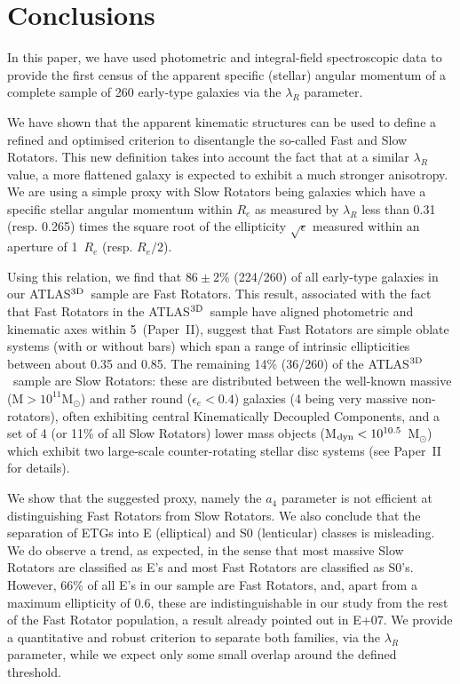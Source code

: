 \documentclass[useAMS,usenatbib,usegraphicx]{mn2e}
\newcommand{\atlas}{{ATLAS$^{\rm 3D}$}}
\begin{document}
\section{Conclusions}
\label{sec:conclusions}

In this paper, we have used photometric and integral-field spectroscopic data
to provide the first census of the apparent specific (stellar) angular momentum of
a complete sample of 260 early-type galaxies via the $\lambda_R$ parameter. 

We have shown that the apparent
kinematic structures can be used to define a refined and optimised criterion to disentangle
the so-called Fast and Slow Rotators. This new definition takes into account the
fact that at a similar $\lambda_R$ value, a more flattened galaxy is expected to exhibit
a much stronger anisotropy. We are using a simple proxy 
with Slow Rotators being galaxies which have a specific stellar angular momentum within $R_e$
as measured by ${\lambda_R}$ less than 0.31 (resp. 0.265) times the square root
of the ellipticity $\sqrt{\epsilon}$ measured within an aperture of 1~$R_e$ (resp. $R_e/2$).

Using this relation, we find that $86 \pm 2 $\% (224/260) of all early-type galaxies in
our \atlas\ sample are Fast Rotators. 
This result, associated with the fact that Fast Rotators
in the \atlas\ sample have aligned photometric and kinematic axes within 5\degr\
(Paper~II), suggest that Fast Rotators are simple
oblate systems (with or without bars) which span a range of intrinsic ellipticities 
between about 0.35 and 0.85. The remaining 14\% (36/260) of the \atlas\ sample
are Slow Rotators: these are distributed between the well-known massive (M$>10^{11}$M$_{\odot}$)
and rather round ($\epsilon_e < 0.4$) galaxies (4 being very massive
non-rotators), often exhibiting central Kinematically
Decoupled Components, and a set of 4 (or 11\% of all Slow Rotators) lower mass objects 
(M$_{\rm dyn} < 10^{10.5}$~M$_{\odot}$) which exhibit two large-scale 
counter-rotating stellar disc systems (see Paper~II for details).

We show that the suggested proxy, namely the $a_4$ parameter
is not efficient at distinguishing Fast Rotators from Slow Rotators. 
We also conclude that the separation of ETGs into E (elliptical) and S0 (lenticular) classes
is misleading. We do observe a trend, as expected, in the sense that most massive Slow Rotators are
classified as E's and most Fast Rotators are classified as S0's. However, 66\%
of all E's in our sample are Fast Rotators, and, apart from a maximum ellipticity
of 0.6, these are indistinguishable in our study from the rest of the 
Fast Rotator population, a result already pointed out in E+07.
We provide a quantitative and robust criterion to separate both families,
via the $\lambda_R$ parameter, while we expect only some small overlap 
around the defined threshold. 
\end{document}
